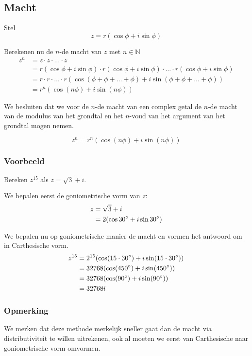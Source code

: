 \documentclass[12pt,twoside,a4paper]{article}
\begin{document}
\subsection{Macht}

Stel
\[z = r (\cos \phi + i \sin \phi )\]

Berekenen nu de $n$-de macht van $z$ met $n\in\mathbb{N}$
\begin{align*}
  z^n &= z \cdot z \cdot \ldots \cdot z\\
      &= r (\cos \phi + i \sin \phi ) \cdot r (\cos \phi + i \sin \phi ) \cdot \ldots \cdot r (\cos \phi + i \sin \phi )\\
      &= r \cdot r \cdot \ldots \cdot r (\cos( \phi + \phi + \ldots + \phi ) + i \sin( \phi + \phi + \ldots + \phi ))\\
      &= r^n \left(\cos(n\phi) + i\sin(n\phi)\right)
\end{align*}

We besluiten dat we voor de $n$-de macht van een complex getal de $n$-de macht van de modulus van het grondtal en het $n$-voud van het argument van het grondtal mogen nemen.

\begin{mdframed}
  \[
    z^n = r^n \left(\cos(n\phi) + i\sin(n\phi)\right)
  \]
\end{mdframed}

\subsubsection*{Voorbeeld}

Bereken $z^{15}$ als $z=\sqrt{3} + i$.

We bepalen eerst de goniometrische vorm van $z$:
\begin{align*}
  z &= \sqrt{3} + i\\
    &= 2(\cos30^\circ + i\sin30^\circ)
\end{align*}

We bepalen nu op goniometrische manier de macht en vormen het antwoord om in Carthesische vorm.
\begin{align*}
  z^{15} &= 2^{15}(\cos(15 \cdot 30^\circ) + i\sin(15 \cdot 30^\circ))\\
         &= 32768(\cos(450^\circ) + i\sin(450^\circ))\\
         &= 32768(\cos(90^\circ) + i\sin(90^\circ))\\
         &= 32768i
\end{align*}

\subsubsection*{Opmerking}
We merken dat deze methode merkelijk sneller gaat dan de macht via distributiviteit te willen uitrekenen, ook al moeten we eerst van Carthesische naar goniometrische vorm omvormen.
\end{document}
